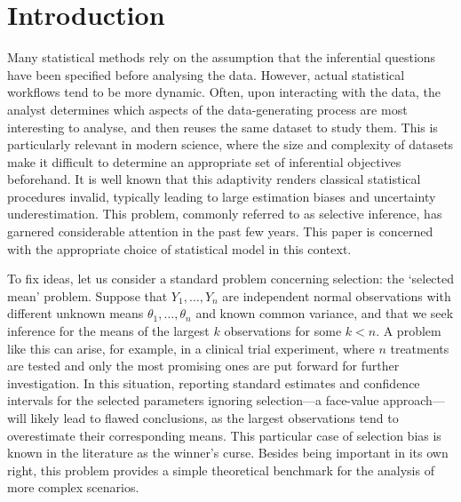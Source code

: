 \documentclass[pdflatex,sn-chicago]{sn-jnl}%
\theoremstyle{thmstyleone}%
\theoremstyle{thmstyletwo}%
\theoremstyle{thmstylethree}%
\begin{document}



\maketitle

\section{Introduction}

Many statistical methods rely on the assumption that the inferential questions have been specified before analysing the data. However, actual statistical workflows tend to be more dynamic. Often, upon interacting with the data, the analyst determines which aspects of the data-generating process are most interesting to analyse, and then reuses the same dataset to study them. This is particularly relevant in modern science, where the size and complexity of datasets make it difficult to determine an appropriate set of inferential objectives beforehand. It is well known that this adaptivity renders classical statistical procedures invalid, typically leading to large estimation biases and uncertainty underestimation. This problem, commonly referred to as selective inference, has garnered considerable attention in the past few years. This paper is concerned with the appropriate choice of statistical model in this context.

To fix ideas, let us consider a standard problem concerning selection: the `selected mean' problem. Suppose that $Y_1, \ldots, Y_n$ are independent normal observations with different unknown means $\theta_1, \ldots, \theta_n$ and known common variance, and that we seek inference for the means of the largest $k$ observations for some $k < n$. A problem like this can arise, for example, in a clinical trial experiment, where $n$ treatments are tested and only the most promising ones are put forward for further investigation. In this situation, reporting standard estimates and confidence intervals for the selected parameters ignoring selection---a face-value approach---will likely lead to flawed conclusions, as the largest observations tend to overestimate their corresponding means. This particular case of selection bias is known in the literature as the winner's curse. Besides being important in its own right, this problem provides a simple theoretical benchmark for the analysis of more complex scenarios. 
\end{document}
